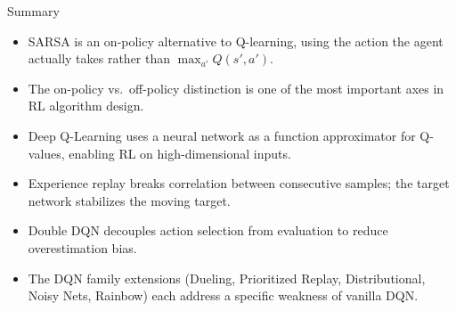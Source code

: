 \begin{frame}[allowframebreaks]{Summary}
    \begin{itemize}
        \setlength{\itemsep}{1em}
        \item SARSA is an on-policy alternative to Q-learning, using the action the agent actually takes rather than $\max_{a'} Q(s',a')$.
        \item The on-policy vs.\ off-policy distinction is one of the most important axes in RL algorithm design.
        \item Deep Q-Learning uses a neural network as a function approximator for Q-values, enabling RL on high-dimensional inputs.
        \item Experience replay breaks correlation between consecutive samples; the target network stabilizes the moving target.
        \item Double DQN decouples action selection from evaluation to reduce overestimation bias.
        \item The DQN family extensions (Dueling, Prioritized Replay, Distributional, Noisy Nets, Rainbow) each address a specific weakness of vanilla DQN.
    \end{itemize}
\end{frame}